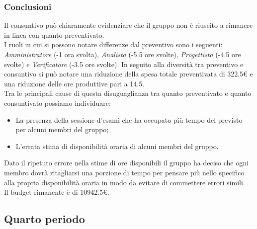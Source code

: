 \subsubsection{Conclusioni}
Il consuntivo può chiaramente evidenziare che il gruppo non è riuscito a rimanere in linea con quanto preventivato.
\\I ruoli in cui si possono notare differenze dal preventivo sono i seguenti: \textit{Amministratore} (-1 ora svolta), \textit{Analista} (-5.5 ore svolte), \textit{Progettista} (-4.5 ore svolte) e \textit{Verificatore} (-3.5 ore svolte).
In seguito alla diversità tra preventivo e consuntivo si può notare una riduzione della spesa totale preventivata di 322.5€ e una riduzione delle ore produttive pari a 14.5.
\\Tra le principali cause di questa disuguaglianza tra quanto preventivato e quanto consuntivato possiamo individuare:
    \begin{itemize}
        \item La presenza della sessione d'esami che ha occupato più tempo del previsto per alcuni membri del gruppo;
        \item L'errata stima di disponibilità oraria di alcuni membri del gruppo.
    \end{itemize}
Dato il ripetuto errore nella stime di ore disponibili il gruppo ha deciso che ogni membro dovrà ritagliarsi una porzione di tempo per pensare più nello specifico alla propria disponibilità oraria in modo da evitare di commettere errori simili.
\\Il budget rimanente è di \num{10942.5}€.

\subsection{Quarto periodo}

